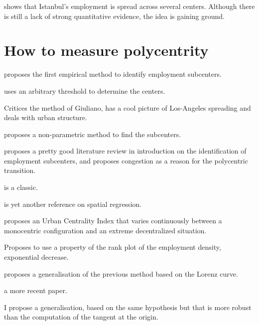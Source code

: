 \cite{Dokmeci:1994} shows that Istanbul's employment is spread across several
centers. Although there is still a lack of strong quantitative evidence, the
idea is gaining ground.



\section{How to measure polycentrity}
\label{sec:how_to_measure_polycentrity}

\cite{McDonald:1987} proposes the first empirical method to identify employment
subcenters.

\cite{Giuliano:1991} uses an arbitrary threshold to determine the centers.

\cite{Anas:1998} Critices the method of Giuliano, has a cool picture of
Los-Angeles spreading and deals with urban structure.

\cite{McMillen:2001} proposes a non-parametric method to find the subcenters.

\cite{McMillen:2003} proposes a pretty good literature review in introduction on
the identification of employment subcenters, and proposes congestion as a reason
for the polycentric transition.

\cite{Tsai:2005} is a classic.

\cite{Griffith:2007} is yet another reference on spatial regression.

\cite{Pereira:2013} proposes an Urban Centrality Index that varies continuously
between a monocentric configuration and an extreme decentralized situation.

\cite{Louf:2013_polycentric} Proposes to use a property of the rank plot of the
employment density, exponential decrease.

\cite{Louail:2014} proposes a generalisation of the previous method based on the
Lorenz curve.

\cite{LeNechet:2015} a more recent paper.

I propose a generalisation, based on the same hypothesis but that is more robust
than the computation of the tangent at the origin.
